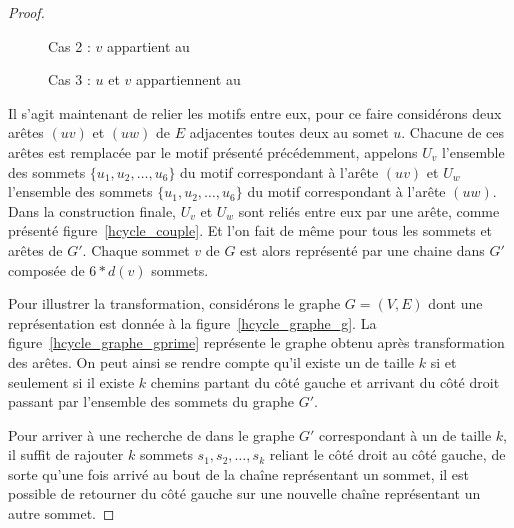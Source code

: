 \begin{proof}
    \begin{figure}
        \begin{center}
            \begin{tikzpicture}
                
            \end{tikzpicture}
            \caption{Cas 2 : $v$ appartient au \vcover}
            \label{motif_v}
        \end{center}
    \end{figure}

    \begin{figure}
        \begin{center}
            \begin{tikzpicture}
                
            \end{tikzpicture}
            \caption{Cas 3 : $u$ et $v$ appartiennent au \vcover}
            \label{motif_uv}
        \end{center}
    \end{figure}

    Il s'agit maintenant de relier les motifs entre eux, pour ce faire considérons deux arêtes
    $(uv)$ et $(uw)$ de $E$ adjacentes toutes deux au somet $u$. Chacune de ces arêtes est remplacée
    par le motif présenté précédemment, appelons $U_v$ l'ensemble des sommets $\{u_1, u_2, \dots,
    u_6\}$ du motif correspondant à l'arête $(uv)$ et $U_w$ l'ensemble des sommets $\{u_1, u_2,
    \dots, u_6\}$ du motif correspondant à l'arête $(uw)$. Dans la construction finale, $U_v$ et
    $U_w$ sont reliés entre eux par une arête, comme présenté figure~\ref{hcycle_couple}. Et l'on
    fait de même pour tous les sommets et arêtes de $G'$. Chaque sommet $v$ de $G$ est alors représenté
    par une chaine dans $G'$ composée de $6*d(v)$ sommets.

    Pour illustrer la transformation, considérons le graphe $G = (V, E)$ dont une représentation est
    donnée à la figure~\ref{hcycle_graphe_g}. La figure~\ref{hcycle_graphe_gprime} représente le
    graphe obtenu après transformation des arêtes. On peut ainsi se rendre compte qu'il existe un
    \vcover de taille $k$ si et seulement si il existe $k$ chemins partant du côté gauche et
    arrivant du côté droit passant par l'ensemble des sommets du graphe $G'$.

    Pour arriver à une recherche de \hcycle dans le graphe $G'$ correspondant à un \vcover de taille
    $k$, il suffit de rajouter $k$ sommets $s_1, s_2, \dots, s_k$ reliant le côté droit au côté
    gauche, de sorte qu'une fois arrivé au bout de la chaîne représentant un sommet, il est possible
    de retourner du côté gauche sur une nouvelle chaîne représentant un autre sommet.


\end{proof}
